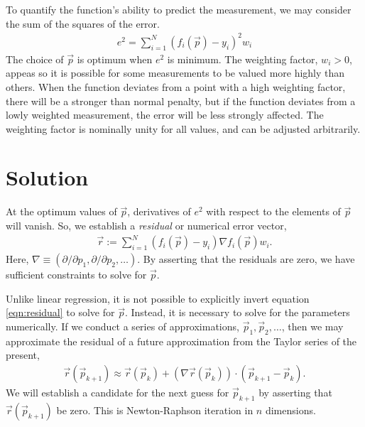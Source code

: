 \documentclass{article}
\def\p{\vec{p}}
\def\r{\vec{r}}
\begin{document}
To quantify the function's ability to predict the measurement, we may consider the sum of the squares of the error.
\begin{align}
e^2 = \sum_{i=1}^N (f_i(\p) - y_i)^2 w_i
\end{align}
The choice of $\p$ is optimum when $e^2$ is minimum.  The weighting factor, $w_i > 0$, appeas so it is possible for some measurements to be valued more highly than others.  When the function deviates from a point with a high weighting factor, there will be a stronger than normal penalty, but if the function deviates from a lowly weighted measurement, the error will be less strongly affected.  The weighting factor is nominally unity for all values, and can be adjusted arbitrarily.

\section{Solution}
At the optimum values of $\p$, derivatives of $e^2$ with respect to the elements of $\p$ will vanish.  So, we establish a \emph{residual} or numerical error vector,
\begin{align}
\r := \sum_{i=1}^N (f_i(\p) - y_i) \nabla f_i(\p) w_i.\label{eqn:residual}
\end{align}
Here, $\nabla \equiv (\partial/\partial p_1, \partial/\partial p_2, \ldots )$.  By asserting that the residuals are zero, we have sufficient constraints to solve for $\p$.

Unlike linear regression, it is not possible to explicitly invert equation \ref{eqn:residual} to solve for $\p$.  Instead, it is necessary to solve for the parameters numerically.  If we conduct a series of approximations, $\p_1, \p_2, \ldots$, then we may approximate the residual of a future approximation from the Taylor series of the present,
\begin{align}
\r(\p_{k+1}) \approx \r(\p_k) + (\nabla \r(\p_k))\cdot (\p_{k+1} - \p_k).\label{ref:rstep}
\end{align}
We will establish a candidate for the next guess for $\p_{k+1}$ by asserting that $\r(\p_{k+1})$ be zero.  This is Newton-Raphson iteration in $n$ dimensions.
\end{document}

